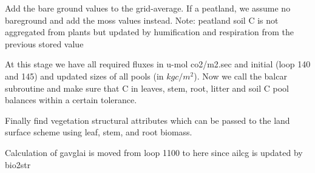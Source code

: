 Add the bare ground values to the grid-\/average. If a peatland, we assume no bareground and add the moss values instead. Note\+: peatland soil C is not aggregated from plants but updated by humification and respiration from the previous stored value

At this stage we have all required fluxes in u-\/mol co2/m2.\+sec and initial (loop 140 and 145) and updated sizes of all pools (in $kg c/m^2$). Now we call the balcar subroutine and make sure that C in leaves, stem, root, litter and soil C pool balances within a certain tolerance.

Finally find vegetation structural attributes which can be passed to the land surface scheme using leaf, stem, and root biomass.

Calculation of gavglai is moved from loop 1100 to here since ailcg is updated by bio2str